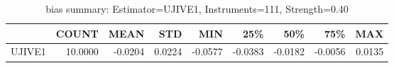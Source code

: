 \begin{table}[ht]
\centering
\caption{bias summary: Estimator=UJIVE1, Instruments=111, Strength=0.40}
\begin{tabular}{lrrrrrrrr}
\toprule
 & COUNT & MEAN & STD & MIN & 25\% & 50\% & 75\% & MAX \\
\midrule
UJIVE1 & 10.0000 & -0.0204 & 0.0224 & -0.0577 & -0.0383 & -0.0182 & -0.0056 & 0.0135 \\
\bottomrule
\end{tabular}
\end{table}
